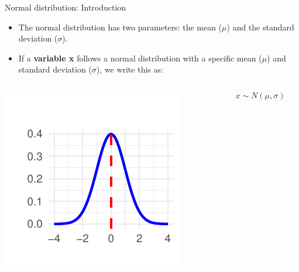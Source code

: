 \documentclass[
  ignorenonframetext,
]{beamer}
\providecommand{\tightlist}{%
  \setlength{\itemsep}{0pt}\setlength{\parskip}{0pt}}
\begin{document}
\begin{frame}{Normal distribution: Introduction}
\label{normal-distribution-introduction-1}
\begin{itemize}
\tightlist
\item
  The normal distribution has two parameters: the mean (\(\mu\)) and the
  standard deviation (\(\sigma\)).
\end{itemize}

\begin{itemize}
\tightlist
\item
  If a \textbf{variable x} follows a normal distribution with a specific
  mean (\(\mu\)) and standard deviation (\(\sigma\)), we write this as:
\end{itemize}

\begin{columns}[T]
\begin{column}{0.48\textwidth}
\includegraphics{M5-Hypothesis-Testing,-Probability-and-Distribution_files/figure-beamer/unnamed-chunk-1-1.pdf}
\end{column}

\begin{column}{0.48\textwidth}
\vspace{2cm}

\[
x \sim N(\mu, \sigma)
\]
\end{column}
\end{columns}
\end{frame}
\end{document}
